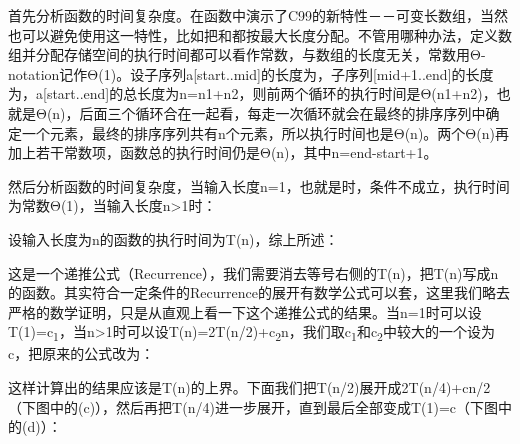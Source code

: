 首先分析函数的时间复杂度。在函数中演示了C99的新特性－－可变长数组，当然也可以避免使用这一特性，比如把和都按最大长度分配。不管用哪种办法，定义数组并分配存储空间的执行时间都可以看作常数，与数组的长度无关，常数用Θ-notation记作Θ(1)。设子序列a[start.\BookSplit{}.\BookSplit{}mid]的长度为，子序列[mid+\BookSplit{}1.\BookSplit{}.\BookSplit{}end]的长度为，a[start.\BookSplit{}.\BookSplit{}end]的总长度为n=\BookSplit{}n1+\BookSplit{}n2，则前两个循环的执行时间是Θ(n1+\BookSplit{}n2)，也就是Θ(n)，后面三个循环合在一起看，每走一次循环就会在最终的排序序列中确定一个元素，最终的排序序列共有n个元素，所以执行时间也是Θ(n)。两个Θ(n)再加上若干常数项，函数总的执行时间仍是Θ(n)，其中n=\BookSplit{}end-start+\BookSplit{}1。



然后分析函数的时间复杂度，当输入长度n=\BookSplit{}1，也就是时，条件不成立，执行时间为常数Θ(1)，当输入长度n\textgreater{}1时：


\begin{BookLiteral}
\end{BookLiteral}


设输入长度为n的函数的执行时间为T(n)，综上所述：




这是一个递推公式（Recurrence），我们需要消去等号右侧的T(n)，把T(n)写成n的函数。其实符合一定条件的Recurrence的展开有数学公式可以套，这里我们略去严格的数学证明，只是从直观上看一下这个递推公式的结果。当n=\BookSplit{}1时可以设T(1)=c\textsubscript{1}，当n\textgreater{}1时可以设T(n)=2T(n/\BookSplit{}2)+c\textsubscript{2}n，我们取c\textsubscript{1}和c\textsubscript{2}中较大的一个设为c，把原来的公式改为：




这样计算出的结果应该是T(n)的上界。下面我们把T(n/\BookSplit{}2)展开成2T(n/\BookSplit{}4)+cn/\BookSplit{}2（下图中的(c)），然后再把T(n/\BookSplit{}4)进一步展开，直到最后全部变成T(1)=c（下图中的(d)）：




